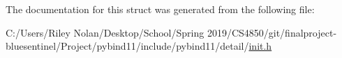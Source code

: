The documentation for this struct was generated from the following file\+:\begin{DoxyCompactItemize}
\item 
C\+:/\+Users/\+Riley Nolan/\+Desktop/\+School/\+Spring 2019/\+C\+S4850/git/finalproject-\/bluesentinel/\+Project/pybind11/include/pybind11/detail/\mbox{\hyperlink{init_8h}{init.\+h}}\end{DoxyCompactItemize}
